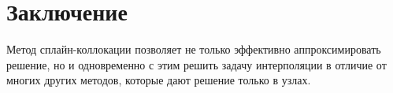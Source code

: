 \documentclass[a4paper,14pt]{extarticle}
\begin{document}
    \newpage
    \section{Заключение}

    Метод сплайн-коллокации позволяет не только эффективно аппроксимировать решение, но и одновременно с этим решить задачу интерполяции в отличие от многих других методов, которые дают решение только в узлах.

    \newpage
    \printbibliography[title={Список литературы}]
\end{document}
